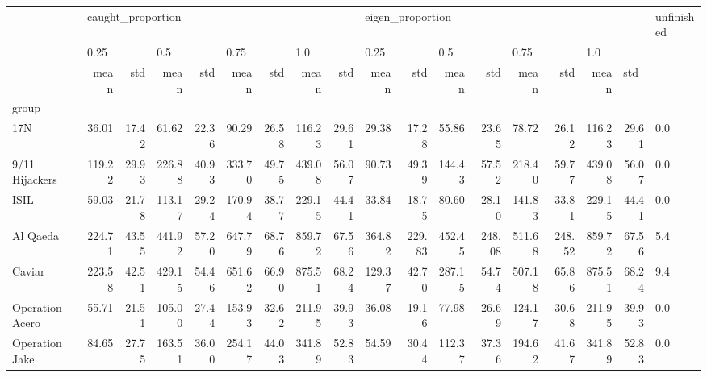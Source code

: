 \begin{tabular}{lrrrrrrrrrrrrrrrrl}
\toprule
{} & \multicolumn{8}{l}{caught\_proportion} & \multicolumn{8}{l}{eigen\_proportion} & unfinished \\
{} & \multicolumn{2}{l}{0.25} & \multicolumn{2}{l}{0.5} & \multicolumn{2}{l}{0.75} & \multicolumn{2}{l}{1.0} & \multicolumn{2}{l}{0.25} & \multicolumn{2}{l}{0.5} & \multicolumn{2}{l}{0.75} & \multicolumn{3}{l}{1.0} \\
{} &              mean &    std &    mean &    std &    mean &    std &    mean &    std &             mean &     std &    mean &     std &    mean &     std &    mean & \multicolumn{2}{l}{std} \\
group                &                   &        &         &        &         &        &         &        &                  &         &         &         &         &         &         &        &            \\
\midrule
17N                  &             36.01 &  17.42 &   61.62 &  22.36 &   90.29 &  26.58 &  116.23 &  29.61 &            29.38 &   17.28 &   55.86 &   23.65 &   78.72 &   26.12 &  116.23 &  29.61 &        0.0 \\
9/11 Hijackers       &            119.22 &  29.93 &  226.88 &  40.93 &  333.70 &  49.75 &  439.08 &  56.07 &            90.73 &   49.39 &  144.43 &   57.52 &  218.40 &   59.77 &  439.08 &  56.07 &        0.0 \\
ISIL                 &             59.03 &  21.78 &  113.17 &  29.24 &  170.94 &  38.77 &  229.15 &  44.41 &            33.84 &   18.75 &   80.60 &   28.10 &  141.83 &   33.81 &  229.15 &  44.41 &        0.0 \\
Al Qaeda             &            224.71 &  43.55 &  441.92 &  57.20 &  647.79 &  68.76 &  859.72 &  67.56 &           364.82 &  229.83 &  452.45 &  248.08 &  511.68 &  248.52 &  859.72 &  67.56 &        5.4 \\
Caviar               &            223.58 &  42.51 &  429.15 &  54.46 &  651.62 &  66.90 &  875.51 &  68.24 &           129.37 &   42.70 &  287.15 &   54.74 &  507.18 &   65.86 &  875.51 &  68.24 &        9.4 \\
Operation Acero      &             55.71 &  21.51 &  105.00 &  27.44 &  153.93 &  32.62 &  211.95 &  39.93 &            36.08 &   19.16 &   77.98 &   26.69 &  124.17 &   30.68 &  211.95 &  39.93 &        0.0 \\
Operation Jake       &             84.65 &  27.75 &  163.51 &  36.00 &  254.17 &  44.03 &  341.89 &  52.83 &            54.59 &   30.44 &  112.37 &   37.36 &  194.62 &   41.67 &  341.89 &  52.83 &        0.0 \\

\end{tabular}
